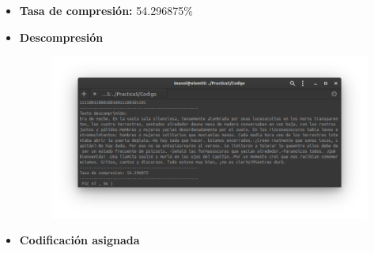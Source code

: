 \begin{itemize}
                \newpage
            \item \textbf{Tasa de compresión:} 54.296875\% \\
            \item \textbf{Descompresión} \\
                \begin{figure}[h!]
                    \centering
                    \includegraphics[width=17cm]{Huffman/ejemplos/ejemplo1/ej1-decode.png}
                \end{figure}
                \newpage
            \item \textbf{Codificación asignada} \\
                \begin{figure}[h!]
                    \centering

\end{figure}
\end{itemize}
